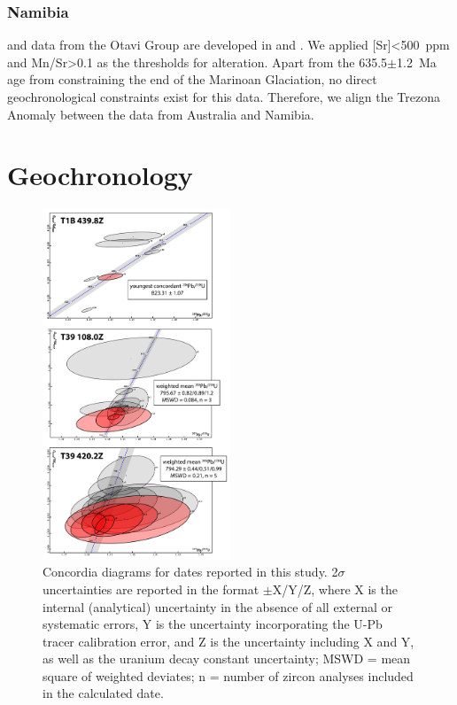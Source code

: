 \subsubsection{Namibia}

\dC and \SrSr data from the Otavi Group are developed in \citet{Halverson2005a} and \citet{Halverson2007b}. We applied [Sr]\textless500~ppm and Mn/Sr\textgreater0.1 as the thresholds for \SrSr alteration. Apart from the 635.5$\pm$1.2~Ma age from \citet{Hoffmann2004a} constraining the end of the Marinoan Glaciation, no direct geochronological constraints exist for this data. Therefore, we align the Trezona Anomaly between the data from Australia and Namibia.

\clearpage

\section{Geochronology}

\begin{figure}[h!]
\begin{center}
	\includegraphics[width=0.5\textwidth]{figures/Tambien/concordia.pdf}
	\caption[Concordia diagrams for geochronology samples.]{Concordia diagrams for dates reported in this study. 2$\sigma$ uncertainties are reported in the format $\pm$X/Y/Z, where X is the internal (analytical) uncertainty in the absence of all external or systematic errors, Y is the uncertainty incorporating the U-Pb tracer calibration error, and Z is the uncertainty including X and Y, as well as the uranium decay constant uncertainty; MSWD = mean square of weighted deviates; n = number of zircon analyses included in the calculated date.}
	\label{fig:concordia}
\end{center}
\end{figure}

